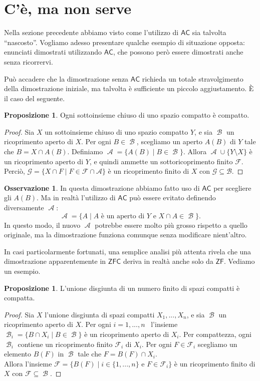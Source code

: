 \documentclass[12pt,a4paper]{report}
\theoremstyle{definition}
\newtheorem{oss}[teo]{Osservazione}  %
\newtheorem{prop}[teo]{Proposizione}  %
\theoremstyle{num.custom-title}
\DeclareMathOperator{\A}{\mathcal{A}}
\DeclareMathOperator{\B}{\mathcal{B}}
\DeclareMathOperator{\sm}{\setminus}
\newcommand{\AC}{\ensuremath{\mathsf{AC}}\xspace}
\newcommand{\ZF}{\ensuremath{\mathsf{ZF}}\xspace}
\newcommand{\ZFC}{\ensuremath{\mathsf{ZFC}}\xspace}
\begin{document}
\section{C'è, ma non serve}

Nella sezione precedente abbiamo visto come l'utilizzo di \AC sia talvolta ``nascosto''. Vogliamo adesso presentare qualche esempio di situazione opposta: enunciati dimostrati utilizzando \AC, che possono però essere dimostrati anche senza ricorrervi.

Può accadere che la dimostrazione senza \AC richieda un totale stravolgimento della dimostrazione iniziale, ma talvolta è sufficiente un piccolo aggiustamento. È il caso del seguente.

\begin{prop}
Ogni sottoinsieme chiuso di uno spazio compatto è compatto.
\begin{proof} Sia $X$ un sottoinsieme chiuso di uno spazio compatto $Y$, e sia $\B$ un ricoprimento aperto di $X$. Per ogni $B \in \B$, scegliamo un aperto $A(B)$ di $Y$ tale che $B=X \cap A(B)$. Definiamo $\A=\{A(B) \mid B \in \B\}$. Allora $\A \cup \{Y \sm X\}$ è un ricoprimento aperto di $Y$, e quindi ammette un sottoricoprimento finito $\mathcal{F}$. Perciò, $\mathcal{G}=\{X \cap F \mid F \in \mathcal{F} \cap \mathcal{A}\}$ è un ricoprimento finito di $X$ con $\mathcal{G} \subseteq \mathcal{B}$.
\end{proof}
\end{prop}

\begin{oss}
In questa dimostrazione abbiamo fatto uso di \AC per scegliere gli $A(B)$. Ma in realtà l'utilizzo di \AC può essere evitato definendo diversamente $\A$:
\[
\A = \{A \mid A \text{ è un aperto di $Y$ e } X \cap A \in \B \}.
\]
In questo modo, il nuovo $\A$ potrebbe essere molto più grosso rispetto a quello originale, ma la dimostrazione funziona comunque senza modificare nient'altro.
\end{oss}

In casi particolarmente fortunati, una semplice analisi più attenta rivela che una dimostrazione apparentemente in \ZFC deriva in realtà anche solo da \ZF. Vediamo un esempio.

\begin{prop}
L'unione disgiunta di un numero finito di spazi compatti è compatta.
\begin{proof}
Sia $X$ l'unione disgiunta di spazi compatti $X_1,...,X_n$, e sia $\B$ un ricoprimento aperto di $X$. Per ogni $i=1,...,n$ \ l'insieme $\B_i=\{B \cap X_i \mid B \in \B \}$ è un ricoprimento aperto di $X_i$. Per compattezza, ogni $\B_i$ contiene un ricoprimento finito $\mathcal{F}_i$ di $X_i$. Per ogni $F \in \mathcal{F}_i$ scegliamo un elemento $B(F)$ in $\B$ tale che $F=B(F) \cap X_i$.\\
Allora l'insieme $\mathcal{F}=\{B(F) \mid i \in \{1,...,n\} \text{ e } F \in \mathcal{F}_i\}$ è un ricoprimento finito di $X$ con $\mathcal{F} \subseteq \B$.
\end{proof}
\end{prop}
\end{document}
